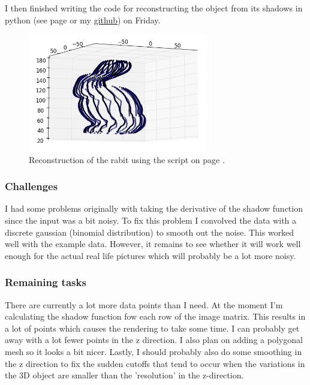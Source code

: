 \documentclass[a4paper]{article}
\begin{document}
I then finished writing the code for reconstructing the object from its shadows in python (see page \pageref{alg:shadow} or my \href{https://github.com/emileokada/image3d}{github}) on Friday.

\begin{figure}[H]
  \centering
    \includegraphics[width=0.7\textwidth]{figures/rabit.png}
    \caption{Reconstruction of the rabit using the script on page \pageref{alg:shadow}.}
  \label{fig:f2}
\end{figure}

\subsubsection{Challenges}
I had some problems originally with taking the derivative of the shadow function since the input was a bit noisy.
To fix this problem I convolved the data with a discrete gaussian (binomial distribution) to smooth out the noise.
This worked well with the example data. 
However, it remains to see whether it will work well enough for the actual real life pictures which will probably be a lot more noisy.

\subsubsection{Remaining tasks}
There are currently a lot more data points than I need. At the moment I'm calculating the shadow function fow each row of the image matrix.
This results in a lot of points which causes the rendering to take some time.
I can probably get away with a lot fewer points in the z direction.
I also plan on adding a polygonal mesh so it looks a bit nicer.
Lastly, I should probably also do some smoothing in the z direction to fix the sudden cutoffs that tend to occur when the variations in the 3D object are smaller than the 'resolution' in the z-direction.
\end{document}
